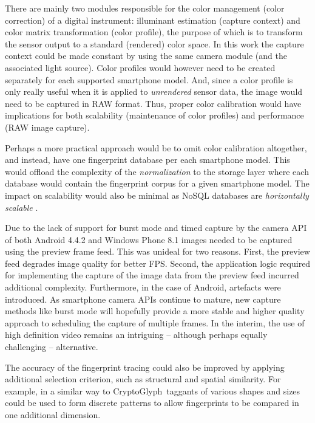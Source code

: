 \documentclass[thesis.tex]{subfiles}
\begin{document}
There are mainly two modules responsible for the color management (color correction) of a digital instrument: illuminant estimation (capture context) and color matrix transformation (color profile), the purpose of which is to transform the sensor output to a standard (rendered) color space. In this work the capture context could be made constant by using the same camera module (and the associated light source). Color profiles would however need to be created separately for each supported smartphone model. And, since a color profile is only really useful when it is applied to \emph{unrendered} sensor data, the image would need to be captured in RAW format. Thus, proper color calibration would have implications for both scalability (maintenance of color profiles) and performance (RAW image capture). \cite{multiple_cameras} \cite{color_correction_pipeline}

Perhaps a more practical approach would be to omit color calibration altogether, and instead, have one fingerprint database per each smartphone model. This would offload the complexity of the \emph{normalization} to the storage layer where each database would contain the fingerprint corpus for a given smartphone model. The impact on scalability would also be minimal as NoSQL databases are \emph{horizontally scalable} \cite{nosql_scalability}.

Due to the lack of support for burst mode and timed capture by the camera API of both Android 4.4.2 and Windows Phone 8.1 images needed to be captured using the preview frame feed. This was unideal for two reasons. First, the preview feed degrades image quality for better FPS. Second, the application logic required for implementing the capture of the image data from the preview feed incurred additional complexity. Furthermore, in the case of Android, artefacts were introduced. As smartphone camera APIs continue to mature, new capture methods like burst mode will hopefully provide a more stable and higher quality approach to scheduling the capture of multiple frames. In the interim, the use of high definition video remains an intriguing -- although perhaps equally challenging -- alternative.

The accuracy of the fingerprint tracing could also be improved by applying additional selection criterion, such as structural and spatial similarity. For example, in a similar way to CryptoGlyph\textregistered\ taggants of various shapes and sizes could be used to form discrete patterns to allow fingerprints to be compared in one additional dimension.
\end{document}
